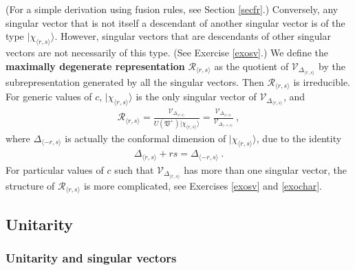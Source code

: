 \documentclass[12pt, a4paper, notitlepage, twoside]{report}
\numberwithin{equation}{section}
\theoremstyle{break}
\begin{document}
(For a simple derivation using fusion rules, see Section \ref{secfr}.)
Conversely, any singular vector that is not itself a descendant of another singular vector is of the type $|\chi_{\langle r,s \rangle}\rangle$.
However, singular vectors that are descendants of other singular vectors are not necessarily of this type. (See 
Exercise \ref{exosv}.) We define the \textbf{\boldmath maximally degenerate representation} $\mathcal{R}_{\langle r,s \rangle}$ as the quotient of $\mathcal{V}_{\Delta_{\langle r,s \rangle}}$ by the subrepresentation generated by all the singular vectors. 
Then $\mathcal{R}_{\langle r,s \rangle}$ is irreducible.
For generic values of $c$, $|\chi_{\langle r,s \rangle}\rangle$ is the only singular vector of $\mathcal{V}_{\Delta_{\langle r,s \rangle}}$, and 
\begin{align}
 \mathcal{R}_{\langle r,s\rangle} =\frac{\mathcal{V}_{\Delta_{\langle r,s \rangle}}}{U(\mathfrak{V}^+) |\chi_{\langle r,s \rangle}\rangle }
= \frac{\mathcal{V}_{\Delta_{\langle r,s \rangle}}}{\mathcal{V}_{\Delta_{\langle -r,s \rangle}} }\ ,
\end{align}
where $\Delta_{\langle -r,s \rangle}$ is actually the conformal dimension of $|\chi_{\langle r,s \rangle}\rangle$, due to the identity
\begin{align}
 \Delta_{\langle r,s \rangle} + rs = \Delta_{\langle -r,s \rangle}\ .
\label{dmr}
\end{align}
For particular values of $c$ such that $\mathcal{V}_{\Delta_{\langle r,s \rangle}}$ has more than one singular vector, the structure of $ \mathcal{R}_{\langle r,s\rangle}$ is more complicated, see Exercises \ref{exosv} and \ref{exochar}.



\subsection{Unitarity}\label{secuni}

\subsubsection{Unitarity and singular vectors}
\end{document}
